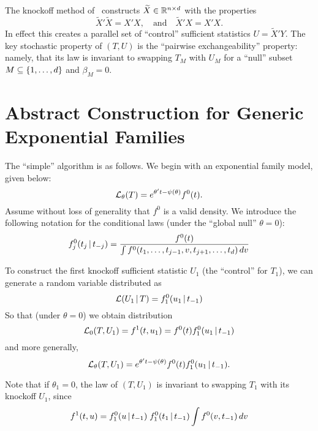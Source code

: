 \documentclass{article}
\begin{document}
The knockoff method of~\citet{barber2014controlling} constructs $\widetilde X\in \mathbb{R}^{n\times d}$ with the properties
\begin{equation}
  \widetilde X'\widetilde X = X'X, \quad\text{and}\quad \widetilde X'X = X'X.
\end{equation}
In effect this creates a parallel set of ``control'' sufficient statistics $U=\widetilde X'Y$. The key stochastic property of $(T,U)$ is the ``pairwise exchangeability'' property: namely, that its law is invariant to swapping $T_M$ with $U_M$ for a ``null'' subset $M\subseteq \{1,\ldots,d\}$ and $\beta_M=0$.

\section{Abstract Construction for Generic Exponential Families}

The ``simple'' algorithm is as follows. We begin with an exponential
family model, given below:
\begin{equation}
  \mathcal{L}_\theta(T) = e^{\theta't - \psi(\theta)}f^0(t).
\end{equation}
Assume without loss of generality that $f^0$ is a valid density. We introduce the following notation for the conditional laws (under the ``global null'' $\theta=0$):
\begin{equation}
  f_j^0(t_j \,|\, t_{-j}) = \frac{f^0(t)}{\int f^0(t_1,\ldots,t_{j-1},v,t_{j+1},\ldots,t_d) \,dv}
\end{equation}

To construct the first knockoff sufficient statistic $U_1$ (the ``control'' for $T_1$), we can generate a random variable distributed as
\begin{equation}
  \mathcal{L}(U_1 \,|\, T) = f_1^0(u_1 \,|\, t_{-1})
\end{equation}
So that (under $\theta=0$) we obtain distribution 
\begin{equation}
  \mathcal{L}_0(T,U_1) = f^1(t, u_1) = f^0(t)f_1^0(u_1\,|\, t_{-1})
\end{equation}
and more generally,
\begin{equation}
  \mathcal{L}_\theta(T,U_1) = e^{\theta't - \psi(\theta)}f^0(t)f_1^0(u_1\,|\, t_{-1}).
\end{equation}

Note that if $\theta_1=0$, the law of $(T,U_1)$ is invariant to swapping $T_1$ with its knockoff $U_1$, since
\begin{equation}
  f^1(t,u) = f_1^0(u \,|\, t_{-1})\; f_1^0(t_1 \,|\, t_{-1}) \int f^0(v,t_{-1})\,dv
\end{equation}
\end{document}
